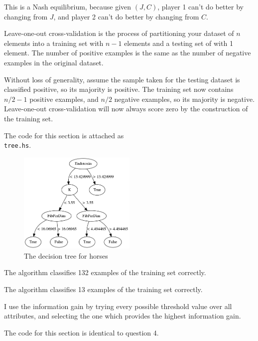 \documentclass[12pt]{article}
\begin{document}
This is a Nash equilibrium, because given $(J,C)$, player 1 can't do better by changing from $J$, and player 2 can't do
better by changing from $C$.

\newpage
\problem

Leave-one-out cross-validation is the process of partitioning your dataset of $n$ elements into a training set with
$n-1$ elements and a testing set of with 1 element. The number of positive examples is the same as the number
of negative examples in the original dataset.

Without loss of generality, assume the sample taken for the testing dataset is classified positive, so its majority is
positive. The training set now contains $n/2 - 1$ positive examples, and $n/2$ negative examples, so its majority is
negative. Leave-one-out cross-validation will now always score zero by the construction of the training set.

\problemsub
The code for this section is attached as \\ \texttt{tree.hs}.

\problemsub
\begin{figure}[h!]
  \caption{The decision tree for horses}
  \centering
    \includegraphics[width=0.5\textwidth]{horse-graph.png}
\end{figure}

\newpage
\problemsub
The algorithm classifies 132 examples of the training set correctly.

\problemsub
The algorithm classifies 13 examples of the training set correctly.

\problemsub
I use the information gain by trying every possible threshold value over all attributes, and selecting the one which
provides the highest information gain.

\problemsub
The code for this section is identical to question 4.
\end{document}
